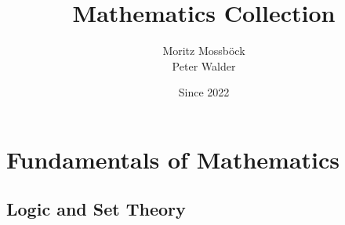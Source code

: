 \documentclass{report}
\author{Moritz Mossböck \\ Peter Walder}
\title{Mathematics Collection}
\date{Since 2022}
\begin{document}
    

    \part{Fundamentals of Mathematics}
    \chapter{Logic and Set Theory}
    
\end{document}

